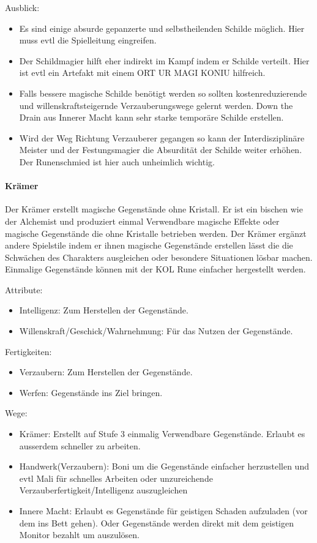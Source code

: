 \documentclass{article}
\begin{document}
Ausblick:
\begin{itemize}
\item Es sind einige absurde gepanzerte und selbstheilenden Schilde möglich. Hier muss evtl die Spielleitung eingreifen.
\item Der Schildmagier hilft eher indirekt im Kampf indem er Schilde verteilt. Hier ist evtl ein Artefakt mit einem ORT UR MAGI KONIU hilfreich.
\item Falls bessere magische Schilde benötigt werden so sollten kostenreduzierende und willenskraftsteigernde Verzauberungswege gelernt werden. Down the Drain aus Innerer Macht kann sehr starke temporäre Schilde erstellen.
\item Wird der Weg Richtung Verzauberer gegangen so kann der Interdisziplinäre Meister und der Festungsmagier die Absurdität der Schilde weiter erhöhen. Der Runenschmied ist hier auch unheimlich wichtig.
\end{itemize}

\paragraph{Krämer}
Der Krämer erstellt magische Gegenstände ohne Kristall. Er ist ein bischen wie der Alchemist und produziert einmal
Verwendbare magische Effekte oder magische Gegenstände die ohne Kristalle betrieben werden. Der Krämer ergänzt andere
Spielstile indem er ihnen magische Gegenstände erstellen lässt die die Schwächen des Charakters ausgleichen oder
besondere Situationen lösbar machen. Einmalige Gegenstände können mit der KOL Rune einfacher hergestellt werden.

Attribute:
\begin{itemize}
\item Intelligenz: Zum Herstellen der Gegenstände.
\item Willenskraft/Geschick/Wahrnehmung: Für das Nutzen der Gegenstände.
\end{itemize}

Fertigkeiten:
\begin{itemize}
\item Verzaubern: Zum Herstellen der Gegenstände.
\item Werfen: Gegenstände ins Ziel bringen.
\end{itemize}

Wege:
\begin{itemize}
\item Krämer: Erstellt auf Stufe 3 einmalig Verwendbare Gegenstände. Erlaubt es ausserdem schneller zu arbeiten.
\item Handwerk(Verzaubern): Boni um die Gegenstände einfacher herzustellen und evtl Mali für schnelles Arbeiten oder unzureichende Verzauberfertigkeit/Intelligenz auszugleichen
\item Innere Macht: Erlaubt es Gegenstände für geistigen Schaden aufzuladen (vor dem ins Bett gehen). Oder Gegenstände werden direkt mit dem geistigen Monitor bezahlt um auszulösen.
\end{itemize}
\end{document}
